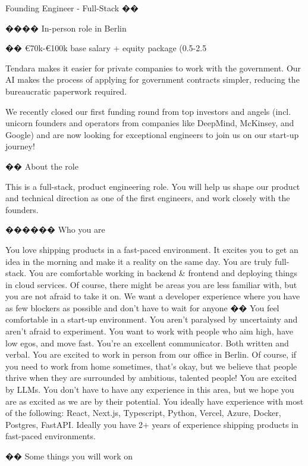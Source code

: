 Founding Engineer - Full-Stack ��

���� In-person role in Berlin

�� €70k-€100k base salary + equity package (0.5-2.5%



Tendara makes it easier for private companies to work with the government. Our AI makes the process of applying for government contracts simpler, reducing the bureaucratic paperwork required.



We recently closed our first funding round from top investors and angels (incl. unicorn founders and operators from companies like DeepMind, McKinsey, and Google) and are now looking for exceptional engineers to join us on our start-up journey!



�� About the role

This is a full-stack, product engineering role. You will help us shape our product and technical direction as one of the first engineers, and work closely with the founders.



����‍�� Who you are

You love shipping products in a fast-paced environment. It excites you to get an idea in the morning and make it a reality on the same day.
You are truly full-stack. You are comfortable working in backend & frontend and deploying things in cloud services. Of course, there might be areas you are less familiar with, but you are not afraid to take it on. We want a developer experience where you have as few blockers as possible and don’t have to wait for anyone ��
You feel comfortable in a start-up environment. You aren’t paralysed by uncertainty and aren’t afraid to experiment.
You want to work with people who aim high, have low egos, and move fast.
You’re an excellent communicator. Both written and verbal.
You are excited to work in person from our office in Berlin. Of course, if you need to work from home sometimes, that’s okay, but we believe that people thrive when they are surrounded by ambitious, talented people!
You are excited by LLMs. You don’t have to have any experience in this area, but we hope you are as excited as we are by their potential.
You ideally have experience with most of the following: React, Next.js, Typescript, Python, Vercel, Azure, Docker, Postgres, FastAPI.
Ideally you have 2+ years of experience shipping products in fast-paced environments.


��️ Some things you will work on


